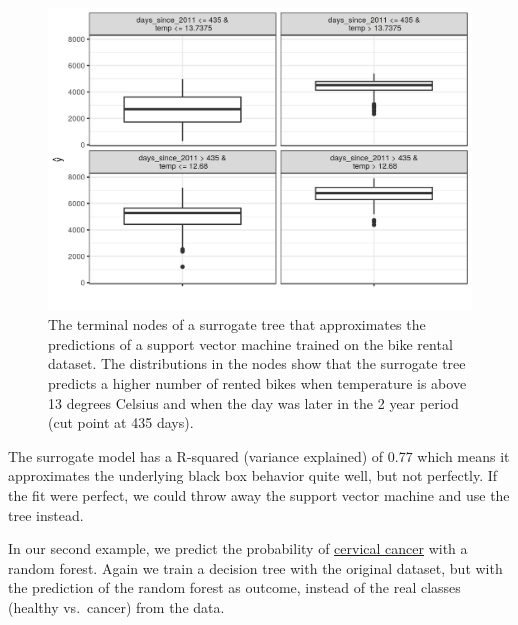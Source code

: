 \documentclass[12pt,]{krantz}
\begin{document}
\begin{figure}

{\centering \includegraphics[width=\textwidth]{images/surrogate-bike-1} 

}

\caption{The terminal nodes of a surrogate tree that approximates the predictions of a support vector machine trained on the bike rental dataset. The distributions in the nodes show that the surrogate tree predicts a higher number of rented bikes when temperature is above 13 degrees Celsius and when the day was later in the 2 year period (cut point at 435 days).}\label{fig:surrogate-bike}
\end{figure}

The surrogate model has a R-squared (variance explained) of 0.77 which
means it approximates the underlying black box behavior quite well, but
not perfectly. If the fit were perfect, we could throw away the support
vector machine and use the tree instead.

In our second example, we predict the probability of
\protect\hyperlink{cervical}{cervical cancer} with a random forest.
Again we train a decision tree with the original dataset, but with the
prediction of the random forest as outcome, instead of the real classes
(healthy vs.~cancer) from the data.
\end{document}
